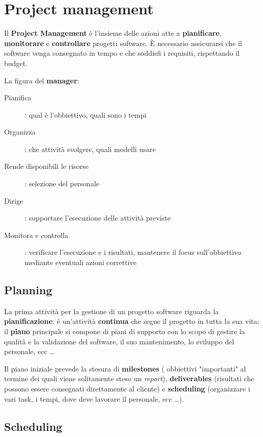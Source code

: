 \section{Project management}
Il \textbf{Project Management} \`e l'insieme delle azioni atte a
\textbf{pianificare}, \textbf{monitorare} e \textbf{controllare}
progetti software. \`E necessario assicurarsi che il software
venga consegnato in tempo e che soddisfi i requisiti, rispettando
il budget.

La figura del \textbf{manager}:

\begin{description}
    \item[Pianifica]: qual \`e l'obbiettivo, quali sono i tempi
    
    \item[Organizza]: che attivit\`a svolgere, quali modelli usare
    
    \item[Rende disponibili le risorse]: selezione del personale
    
    \item[Dirige]: supportare l'esecuzione delle attivit\`a previste
    
    \item[Monitora e controlla]: verificare l'esecuzione e i risultati,
                                mantenere il focus sull'obbiettivo
                                mediante eventuali azioni correttive 
\end{description}

\subsection{Planning}

La prima attivit\`a per la gestione di un progetto software riguarda
la \textbf{pianificazione}: \`e un'attivit\`a \textbf{continua} che
segue il progetto in tutta la sua vita; il \textbf{piano} principale
si compone di piani di supporto con lo scopo di gestire la qualit\`a e
la validazione del software, il suo mantenimento, lo sviluppo del
personale, ecc \dots

Il piano iniziale prevede la stesura di \textbf{milestones} (
obbiettivi "importanti" al termine dei quali viene solitamente steso
un \textit{report}), \textbf{deliverables} (risultati che possono
essere consegnati direttamente al cliente) e \textbf{scheduling}
(organizzare i vari task, i tempi, dove deve lavorare il personale,
ecc \dots).

\subsection{Scheduling}

